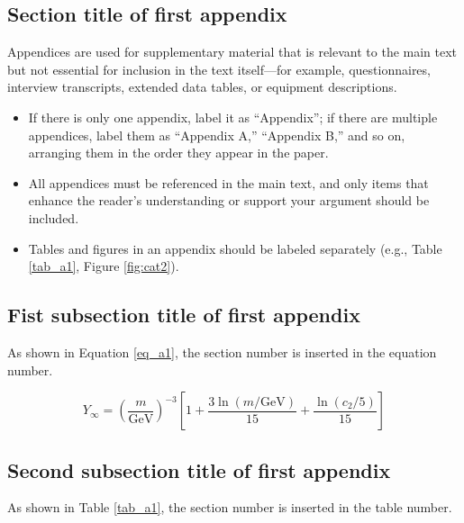 \documentclass[12pt,a4paper]{article}
\begin{document}
\begin{appendices}



\renewcommand{\thesection}{Appendix \Alph{section}}
\renewcommand{\thesubsection}{\Alph{section}.\arabic{subsection}}

\section{Section title of first appendix}
Appendices are used for supplementary material that is relevant to the main text but not essential for inclusion in the text itself—for example, questionnaires, interview transcripts, extended data tables, or equipment descriptions.
\begin{itemize}
\item If there is only one appendix, label it as “Appendix”; if there are multiple appendices, label them as “Appendix A,” “Appendix B,” and so on, arranging them in the order they appear in the paper. 
\item All appendices must be referenced in the main text, and only items that enhance the reader’s understanding or support your argument should be included.
\item Tables and figures in an appendix should be labeled separately (e.g., Table \ref{tab_a1}, Figure \ref{fig:cat2}).
\end{itemize}

\subsection{Fist subsection title of first appendix}
As shown in Equation \ref{eq_a1}, the section number is inserted in the equation number.
\lipsum[11]

\begin{equation}
Y_\infty = \left( \frac{m}{\textrm{GeV}} \right)^{-3}
    \left[ 1 + \frac{3 \ln(m/\textrm{GeV})}{15}
    + \frac{\ln(c_2/5)}{15} \right]
\label{eq_a1}
\end{equation}

\subsection{Second subsection title of first appendix}
As shown in Table \ref{tab_a1}, the section number is inserted in the table number.


\end{appendices}
\end{document}
